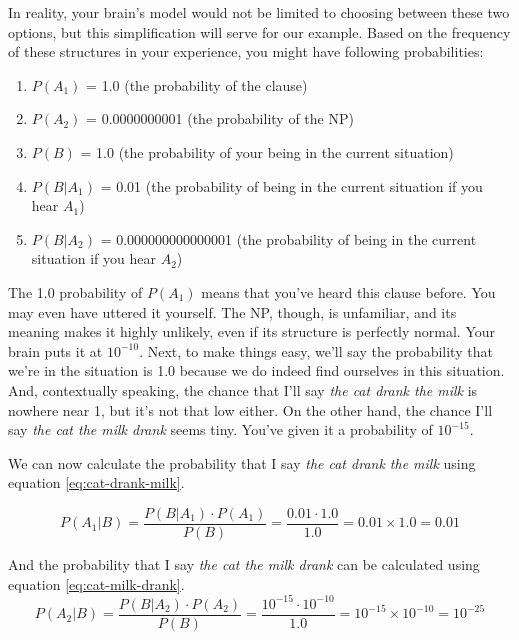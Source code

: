 In reality, your brain's model would not be limited to choosing between these two options, but this simplification will serve for our example.
Based on the frequency of these structures in your experience, you might have following probabilities:

\begin{enumerate}
    \item $P(A_1)$ = 1.0 (the probability of the clause)
    \item $P(A_2)$ = 0.0000000001 (the probability of the NP)
    \item $P(B)$ = 1.0 (the probability of your being in the current situation)
    \item $P(B|A_1)$ = 0.01 (the probability of being in the current situation if you hear $A_1$)
    \item $P(B|A_2)$ = 0.000000000000001 (the probability of being in the current situation if you hear $A_2$)
\end{enumerate}

The 1.0 probability of $P(A_1)$ means that you've heard this clause before. You may even have uttered it yourself. The NP, though, is unfamiliar, and its meaning makes it highly unlikely, even if its structure is perfectly normal. Your brain puts it at $10^{-10}$. Next, to make things easy, we'll say the probability that we're in the situation is 1.0 because we do indeed find ourselves in this situation. And, contextually speaking, the chance that I'll say \textit{the cat drank the milk} is nowhere near 1, but it's not that low either. On the other hand, the chance I'll say \textit{the cat the milk drank} seems tiny. You've given it a probability of $10^{-15}$.

We can now calculate the probability that I say \textit{the cat drank the milk} using equation \ref{eq:cat-drank-milk}.

\begin{equation} \label{eq:cat-drank-milk}
P(A_1|B) = \frac{P(B|A_1) \cdot P(A_1)}{P(B)} = \frac{0.01 \cdot 1.0}{1.0} = 0.01 \times 1.0 = 0.01
\end{equation}

And the probability that I say \textit{the cat the milk drank} can be calculated using equation \ref{eq:cat-milk-drank}.
\begin{equation}\label{eq:cat-milk-drank}
P(A_2|B) = \frac{P(B|A_2) \cdot P(A_2)}{P(B)} = \frac{10^{-15} \cdot 10^{-10}}{1.0} = 10^{-15} \times 10^{-10} = 10^{-25}
\end{equation}


